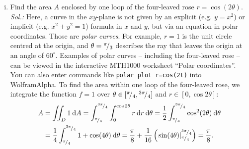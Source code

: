 \begin{example}
\begin{enumerate}[(i)]
	\item Find the area $A$ enclosed by one loop of the four-leaved rose $r=\cos(2\theta)$.\\
	{\it Sol.:} Here, a curve in the $xy$-plane is not given by an explicit (e.g. $y=x^2$) or implicit (e.g. $x^2+y^2=1$) formula in $x$ and $y$, but via an equation in polar coordinates. Those are \emph{polar curves}. For example, $r=1$ is the unit circle centred at the origin, and $\theta = {}^{\pi}\!/_{3}$ describes the ray that leaves the origin at an angle of $60^{\circ}$. Examples of polar curves -- including the four-leaved rose -- can be viewed in the interactive MTH1000 worksheet ``Polar coordinates''. You can also enter commands like \texttt{polar plot r=cos(2t)} into WolframAlpha. To find the area within one loop of the four-leaved rose,
	we integrate the function $f=1$ over $\theta\in[{}^{\pi}\!/_{4},{}^{3\pi}\!/_{4}]$ and $r\in[0,\cos2\theta]$:
	\begin{equation*}
	\begin{split}
	A & = \iint_D 1 \: \d A 
	= \itgr{\rfrac{\pi}{4}}{\rfrac{3\pi}{4}}{\itgr{0}{\cos 2\theta}{r}{r}}{\theta}
	= \frac12 \itgr{\rfrac{\pi}{4}}{\rfrac{3\pi}{4}}{\cos^2(2\theta)}{\theta} \\
	& = \frac14 \itgr{\rfrac{\pi}{4}}{\rfrac{3\pi}{4}}{1+\cos(4\theta)}{\theta} 
	= \frac{\pi}{8} + \frac{1}{16} \left( \left. \sin(4\theta)
				\right|_{\rfrac{\pi}{4}}^{\rfrac{3\pi}{4}} \right) = \frac{\pi}{8}.	
	\end{split}
	\end{equation*}
\end{enumerate}
\end{example}

